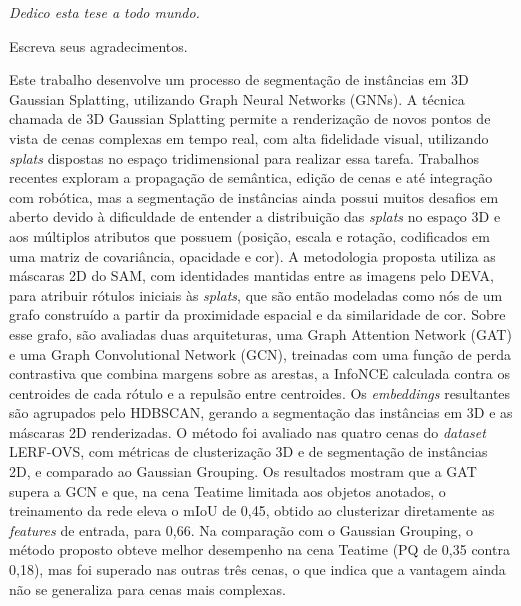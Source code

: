 
\begin{dedicatoria}
    \vspace*{\fill}
    \centering
    \noindent
    \textit{Dedico esta tese a todo mundo.}
    \vspace*{\fill}
\end{dedicatoria}

\begin{agradecimentos}
	Escreva seus agradecimentos.
    
    
	\lipsum[1-3]
\end{agradecimentos}


\begin{resumo}
    Este trabalho desenvolve um processo de segmentação de instâncias em 3D Gaussian Splatting, utilizando Graph Neural Networks (GNNs). A técnica chamada de 3D Gaussian Splatting permite a renderização de novos pontos de vista de cenas complexas em tempo real, com alta fidelidade visual, utilizando \emph{splats} dispostas no espaço tridimensional para realizar essa tarefa. Trabalhos recentes exploram a propagação de semântica, edição de cenas e até integração com robótica, mas a segmentação de instâncias ainda possui muitos desafios em aberto devido à dificuldade de entender a distribuição das \emph{splats} no espaço 3D e aos múltiplos atributos que possuem (posição, escala e rotação, codificados em uma matriz de covariância, opacidade e cor). A metodologia proposta utiliza as máscaras 2D do SAM, com identidades mantidas entre as imagens pelo DEVA, para atribuir rótulos iniciais às \emph{splats}, que são então modeladas como nós de um grafo construído a partir da proximidade espacial e da similaridade de cor. Sobre esse grafo, são avaliadas duas arquiteturas, uma Graph Attention Network (GAT) e uma Graph Convolutional Network (GCN), treinadas com uma função de perda contrastiva que combina margens sobre as arestas, a InfoNCE calculada contra os centroides de cada rótulo e a repulsão entre centroides. Os \emph{embeddings} resultantes são agrupados pelo HDBSCAN, gerando a segmentação das instâncias em 3D e as máscaras 2D renderizadas. O método foi avaliado nas quatro cenas do \emph{dataset} LERF-OVS, com métricas de clusterização 3D e de segmentação de instâncias 2D, e comparado ao Gaussian Grouping. Os resultados mostram que a GAT supera a GCN e que, na cena Teatime limitada aos objetos anotados, o treinamento da rede eleva o mIoU de 0,45, obtido ao clusterizar diretamente as \emph{features} de entrada, para 0,66. Na comparação com o Gaussian Grouping, o método proposto obteve melhor desempenho na cena Teatime (PQ de 0,35 contra 0,18), mas foi superado nas outras três cenas, o que indica que a vantagem ainda não se generaliza para cenas mais complexas. 


\end{resumo}
